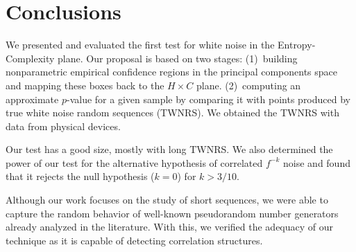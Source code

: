 \section{Conclusions}\label{Sec:Conclusions}

We presented and evaluated the first test for white noise in the  Entropy-Complexity plane.
Our proposal is based on two stages:
(1)~building nonparametric empirical confidence regions in the principal components space and mapping these boxes back to the $H\times C$ plane.
(2)~computing an approximate $p$-value for a given sample by comparing it with points produced by true white noise random sequences (TWNRS).
We obtained the TWNRS with data from physical devices.

Our test has a good size, mostly with long TWNRS.
We also determined the power of our test for the alternative hypothesis of correlated $f^{-k}$ noise and found that it rejects the null hypothesis ($k=0$) for $k>3/10$.

Although our work focuses on the study of short sequences, we were able to capture the random behavior of well-known pseudorandom number generators already analyzed in the literature. 
With this, we verified the adequacy of our technique as it is capable of detecting correlation structures.
